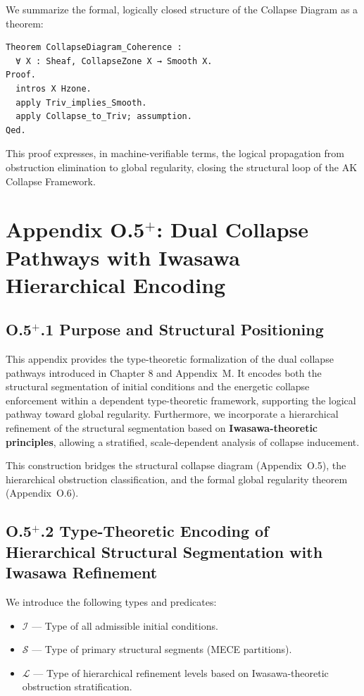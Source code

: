 \documentclass[11pt]{article}
\begin{document}
We summarize the formal, logically closed structure of the Collapse Diagram as a theorem:

\begin{lstlisting}[language=Coq]
Theorem CollapseDiagram_Coherence :
  ∀ X : Sheaf, CollapseZone X → Smooth X.
Proof.
  intros X Hzone.
  apply Triv_implies_Smooth.
  apply Collapse_to_Triv; assumption.
Qed.
\end{lstlisting}

This proof expresses, in machine-verifiable terms, the logical propagation from obstruction elimination to global regularity, closing the structural loop of the AK Collapse Framework.

\section*{Appendix O.5$^+$: Dual Collapse Pathways with Iwasawa Hierarchical Encoding}

\subsection*{O.5$^+$.1 Purpose and Structural Positioning}

This appendix provides the type-theoretic formalization of the dual collapse pathways introduced in Chapter 8 and Appendix~M.  
It encodes both the structural segmentation of initial conditions and the energetic collapse enforcement within a dependent type-theoretic framework, supporting the logical pathway toward global regularity.  
Furthermore, we incorporate a hierarchical refinement of the structural segmentation based on \textbf{Iwasawa-theoretic principles}, allowing a stratified, scale-dependent analysis of collapse inducement.

This construction bridges the structural collapse diagram (Appendix~O.5), the hierarchical obstruction classification, and the formal global regularity theorem (Appendix~O.6).

\subsection*{O.5$^+$.2 Type-Theoretic Encoding of Hierarchical Structural Segmentation with Iwasawa Refinement}

We introduce the following types and predicates:

\begin{itemize}
  \item \( \mathcal{I} \) — Type of all admissible initial conditions.
  \item \( \mathcal{S} \) — Type of primary structural segments (MECE partitions).
  \item \( \mathcal{L} \) — Type of hierarchical refinement levels based on Iwasawa-theoretic obstruction stratification.
\end{itemize}
\end{document}
